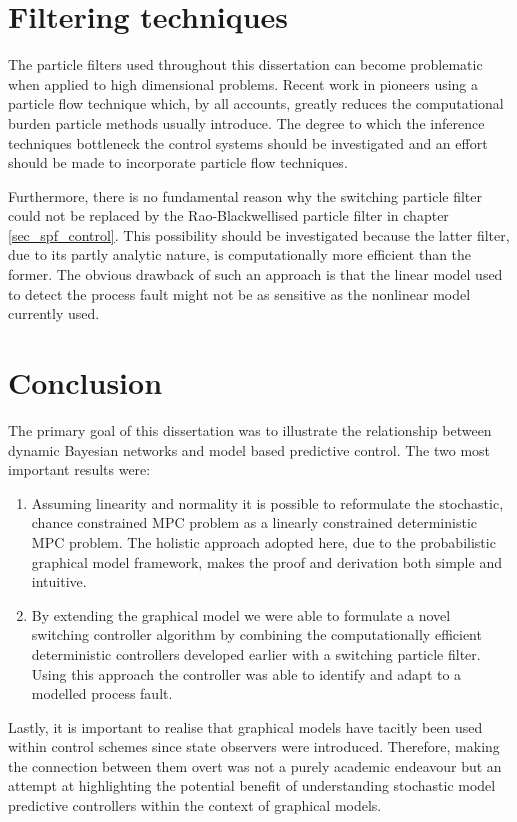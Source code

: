 \section{Filtering techniques}
The particle filters used throughout this dissertation can become problematic when applied to high dimensional problems. Recent work in \cite{daum} pioneers using a particle flow technique which, by all accounts, greatly reduces the computational burden particle methods usually introduce. The degree to which the inference techniques bottleneck the control systems should be investigated and an effort should be made to incorporate particle flow techniques. 

Furthermore, there is no fundamental reason why the switching particle filter could not be replaced by the Rao-Blackwellised particle filter in chapter \ref{sec_spf_control}. This possibility should be investigated because the latter filter, due to its partly analytic nature, is computationally more efficient than the former. The obvious drawback of such an approach is that the linear model used to detect the process fault might not be as sensitive as the nonlinear model currently used.

\section{Conclusion}
The primary goal of this dissertation was to illustrate the relationship between dynamic Bayesian networks and model based predictive control. The two most important results were:
\begin{enumerate}
\item
Assuming linearity and normality it is possible to reformulate the stochastic, chance constrained MPC problem as a linearly constrained deterministic MPC problem. The holistic approach adopted here, due to the probabilistic graphical model framework, makes the proof and derivation both simple and intuitive.
\item
By extending the graphical model we were able to formulate a novel switching controller algorithm by combining the computationally efficient deterministic controllers developed earlier with a switching particle filter. Using this approach the controller was able to identify and adapt to a modelled process fault.
\end{enumerate} 
Lastly, it is important to realise that graphical models have tacitly been used within control schemes since state observers were introduced. Therefore, making the connection between them overt was not a purely academic endeavour but an attempt at highlighting the potential benefit of understanding stochastic model predictive controllers within the context of graphical models. 